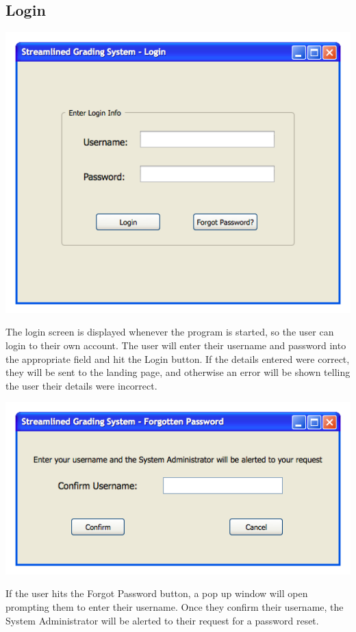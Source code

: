 \documentclass{article}
\begin{document}
\subsection{Login}
\label{login}
\centerline{\includegraphics[scale=0.65]{../images/UIMockups/pngs/loginScreen}}
The login screen is displayed whenever the program is started, so the user can login
to their own account. The user will enter their username and password into the
appropriate field and hit the Login button. If the details entered were correct,
they will be sent to the landing page, and otherwise an error will be shown telling
the user their details were incorrect.\\
\centerline{\includegraphics[scale=0.65]{../images/UIMockups/pngs/forgotPW}}
If the user hits the Forgot Password button, a pop up window will open prompting
them to enter their username. Once they confirm their username, the System 
Administrator will be alerted to their request for a password reset.
\end{document}
